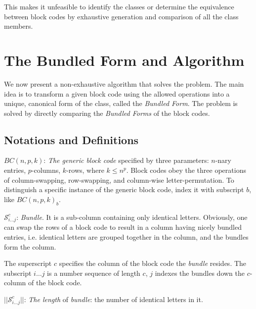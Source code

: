 \documentclass[12pt]{article}  %
\begin{document}
This makes it unfeasible to identify the classes or determine the equivalence between block codes by exhaustive generation and comparison of all the class members.













\section{The Bundled Form and Algorithm}
We now present a non-exhaustive algorithm that solves the problem. The main idea is to transform a given block code using the allowed operations into a unique, canonical form of the class, called the \textit{Bundled Form}. The problem is solved by directly comparing the \textit{Bundled Forms} of the block codes.














\subsection{Notations and Definitions}
$BC(n,p,k)$: \emph{The generic block code} specified by three parameters: $n$-nary entries, $p$-columns, $k$-rows, where $k \leq n^p$. Block codes obey the three operations of column-swapping, row-swapping, and column-wise letter-permutation. To distinguish a specific instance of the generic block code, index it with subscript $b$, like $BC(n,p,k)_b$.


$\mathcal{S}^c_{i\dots j}$: \emph{Bundle}. It is a sub-column containing only identical letters. Obviously, one can swap the rows of a block code to result in a column having nicely bundled entries, i.e. identical letters are grouped together in the column, and the bundles form the column.


The superscript $c$ specifies the column of the block code the \emph{bundle} resides. The subscript $i\dots j$ is a number sequence of length $c$, $j$ indexes the bundles down the $c$-column of the block code.



$||\mathcal{S}^c_{i\dots j}||$: \emph{The length} of \emph{bundle}: the number of identical letters in it.
\end{document}

